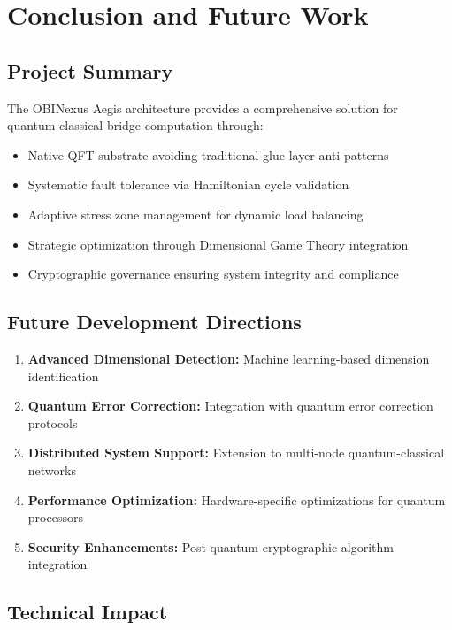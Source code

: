 \documentclass[12pt]{article}
\begin{document}
\section{Conclusion and Future Work}

\subsection{Project Summary}

The OBINexus Aegis architecture provides a comprehensive solution for quantum-classical bridge computation through:

\begin{itemize}
    \item Native QFT substrate avoiding traditional glue-layer anti-patterns
    \item Systematic fault tolerance via Hamiltonian cycle validation
    \item Adaptive stress zone management for dynamic load balancing
    \item Strategic optimization through Dimensional Game Theory integration
    \item Cryptographic governance ensuring system integrity and compliance
\end{itemize}

\subsection{Future Development Directions}

\begin{enumerate}
    \item \textbf{Advanced Dimensional Detection:} Machine learning-based dimension identification
    \item \textbf{Quantum Error Correction:} Integration with quantum error correction protocols
    \item \textbf{Distributed System Support:} Extension to multi-node quantum-classical networks
    \item \textbf{Performance Optimization:} Hardware-specific optimizations for quantum processors
    \item \textbf{Security Enhancements:} Post-quantum cryptographic algorithm integration
\end{enumerate}

\subsection{Technical Impact}
\end{document}
